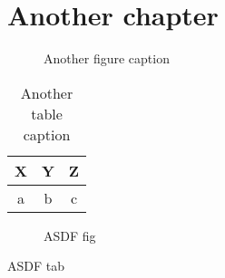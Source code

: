 \documentclass[12pt]{ucsddissertation}
\theoremstyle{plain}%
\theoremstyle{definition}
\begin{document}
\Blinddocument

\setcounter{chapter}{50}
\chapter{Another chapter}
\setcounter{figure}{73}
\setcounter{table}{88}
\begin{figure}
\centering
{}
\caption{Another figure caption}
\end{figure}
\begin{table}
\centering
\caption{Another table caption}
\begin{tabular}{ccc}
\toprule
X&Y&Z\\
\midrule
a&b&c\\
\bottomrule
\end{tabular}
\end{table}
\begin{figure}
\caption{ASDF fig}
\end{figure}
\begin{table}
\caption{ASDF tab}
\end{table}

\appendix
\Blinddocument

\backmatter

\end{document}
